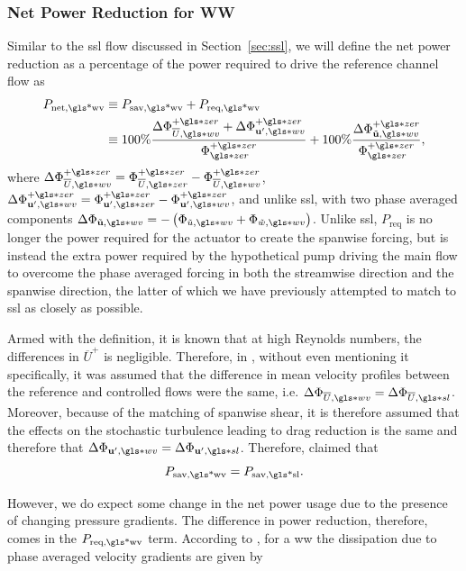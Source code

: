 \subsubsection{Net Power Reduction for WW}
Similar to the  \gls*{ssl} flow discussed in Section~\ref{sec:ssl}, we will define the net power reduction as a percentage of the power required to drive the reference channel flow as
\begin{align}
	P_\text{net,\gls*{wv}} &\equiv P_\text{sav,\gls*{wv}} +P_\text{req,\gls*{wv}} \\
			       &\equiv 100\% \frac{\Delta \Phi _{\overline{U},\gls*{wv}}\pz+\Delta \Phi_{\mathbf{u'} ,\gls*{wv}}\pz }{\Phi \zz\pz} +100\% \frac{\Delta \Phi _{\tilde{\mathbf{u} },\gls*{wv}}\pz}{\Phi \zz\pz}
,\end{align}
where $\Delta \Phi _{\overline{U},\gls*{wv}}\pz=\Phi _{\overline{U},\gls*{zer}}\pz-\Phi _{\overline{U},\gls*{wv}}\pz $, $\Delta \Phi_{\mathbf{u'} ,\gls*{wv}}\pz =\Phi_{\mathbf{u'} ,\gls*{zer}}\pz -\Phi_{\mathbf{u'} ,\gls*{wv}}\pz $, and unlike \gls*{ssl}, with two phase averaged components $\Delta \Phi _{\tilde{\mathbf{u} },\gls*{wv}}=-\left(\Phi _{\tilde{u},\gls*{wv}}+\Phi _{\tilde{w},\gls*{wv}}\right)$. Unlike \gls*{ssl}, $P_\text{req} $ is no longer the power required for the actuator to create the spanwise forcing, but is instead the extra power required by the hypothetical pump driving the main flow to overcome the phase averaged forcing in both the streamwise direction and the spanwise direction, the latter of which we have previously attempted to match to \gls*{ssl} as closely as possible.

Armed with the definition, it is known that at high Reynolds numbers, the differences in $\overline{U}^{+}$ is negligible. Therefore, in \textcite{chernyshenko2013}, without even mentioning it specifically, it was assumed that the difference in mean velocity profiles between the reference and controlled flows were the same, i.e. $\Delta \Phi _{\overline{U},\gls*{wv}}=\Delta \Phi _{\overline{U},\gls*{sl}}$. Moreover, because of the matching of spanwise shear, it is therefore assumed that the effects on the stochastic turbulence leading to drag reduction is the same and therefore that $\Delta \Phi _{\mathbf{u'} ,\gls*{wv}}=\Delta \Phi _{\mathbf{u'} ,\gls*{sl}}$. Therefore, \textcite{chernyshenko2013} claimed that
\begin{equation}
	P_\text{sav,\gls*{wv}} = P_\text{sav,\gls*{sl}}  
.\end{equation}

However, we do expect some change in the net power usage due to the presence of changing pressure gradients. The difference in power reduction, therefore, comes in the $P_\text{req,\gls*{wv}} $ term. According to \sct, for a \gls*{ww} the dissipation due to phase averaged velocity gradients are given by %

